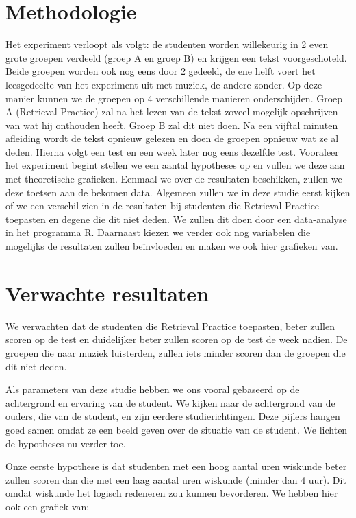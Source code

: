 \documentclass{hogent-article}
\begin{document}
	
	\section{Methodologie}
	
	Het experiment verloopt als volgt: de studenten worden willekeurig in 2 even grote groepen verdeeld (groep A en groep B) en krijgen een tekst voorgeschoteld. Beide groepen worden ook nog eens door 2 gedeeld, de ene helft voert het leesgedeelte van het experiment uit met muziek, de andere zonder. Op deze manier kunnen we de groepen op 4 verschillende manieren onderschijden.
	Groep A (Retrieval Practice) zal na het lezen van de tekst zoveel mogelijk opschrijven van wat hij onthouden heeft. Groep B zal dit niet doen. 
	Na een vijftal minuten afleiding wordt de tekst opnieuw gelezen en doen de groepen opnieuw wat ze al deden.
	Hierna volgt een test en een week later nog eens dezelfde test.
	Vooraleer het experiment begint stellen we een aantal hypotheses op en vullen we deze aan met theoretische grafieken. Eenmaal we over de resultaten beschikken, zullen we deze toetsen aan de bekomen data.
	Algemeen zullen we in deze studie eerst kijken of we een verschil zien in de resultaten bij studenten die Retrieval Practice toepasten en degene die dit niet deden. We zullen dit doen door een data-analyse in het programma R. Daarnaast kiezen we verder ook nog variabelen die mogelijks de resultaten zullen beïnvloeden en maken we ook hier grafieken van.
	
	\section{Verwachte resultaten}
	\label{sec:verwachte_resultaten}
	We verwachten dat de studenten die Retrieval Practice toepasten, beter zullen scoren op de test en duidelijker beter zullen scoren op de test de week nadien. De groepen die naar muziek luisterden, zullen iets minder scoren dan de groepen die dit niet deden.
	
	Als parameters van deze studie hebben we ons vooral gebaseerd op de achtergrond en ervaring van de student. We kijken naar de achtergrond van de ouders, die van de student, en zijn eerdere studierichtingen. Deze pijlers hangen goed samen omdat ze een beeld geven over de situatie van de student. We lichten de hypotheses nu verder toe.
	
	Onze eerste hypothese is dat studenten met een hoog aantal uren wiskunde beter zullen scoren dan die met een laag aantal uren wiskunde (minder dan 4 uur). Dit omdat wiskunde het logisch redeneren zou kunnen bevorderen.
	We hebben hier ook een grafiek van:
	
\end{document}
